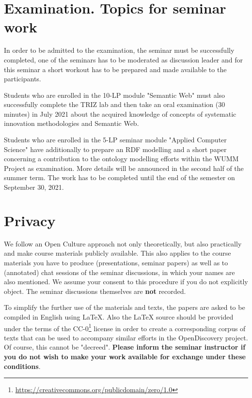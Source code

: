 \documentclass[11pt,a4paper]{article}
\begin{document}
\section{Examination. Topics for seminar work}

In order to be admitted to the examination, the seminar must be successfully
completed, one of the seminars has to be moderated as discussion leader and
for this seminar a short workout has to be prepared and made available to the
participants.

Students who are enrolled in the 10-LP module "Semantic Web" must also
successfully complete the TRIZ lab and then take an oral examination (30
minutes) in July 2021 about the acquired knowledge of concepts of systematic
innovation methodologies and Semantic Web.

Students who are enrolled in the 5-LP seminar module "Applied Computer
Science" have additionally to prepare an RDF modelling and a short paper
concerning a contribution to the ontology modelling efforts \cite{WOP} within
the WUMM Project as examination.  More details will be announced in the second
half of the summer term. The work has to be completed until the end of the
semester on September 30, 2021.

\section{Privacy}

We follow an Open Culture approach not only theoretically, but also
practically and make course materials publicly available.  This also applies
to the course materials you have to produce (presentations, seminar papers) as
well as to (annotated) chat sessions of the seminar discussions, in which your
names are also mentioned.  We assume your consent to this procedure if you do
not explicitly object.  The seminar discussions themselves are \textbf{not}
recorded.

To simplify the further use of the materials and texts, the papers are asked
to be compiled in English using {\LaTeX}.  Also the {\LaTeX} source should be
provided under the terms of the
CC-0\footnote{\url{https://creativecommons.org/publicdomain/zero/1.0}} license
in order to create a corresponding corpus of texts that can be used to
accompany similar efforts in the OpenDiscovery project. Of course, this cannot
be "decreed". \textbf{Please inform the seminar instructor if you do not wish
  to make your work available for exchange under these conditions}.
\end{document}

